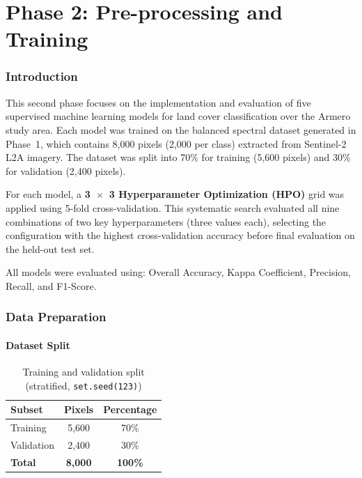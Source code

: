 \documentclass[12pt,a4paper]{article}
\begin{document}
\newpage

\part{Phase 2: Pre-processing and Training}

\section{Introduction}

This second phase focuses on the implementation and evaluation of five supervised machine learning models for land cover classification over the Armero study area. Each model was trained on the balanced spectral dataset generated in Phase~1, which contains 8,000 pixels (2,000 per class) extracted from Sentinel-2 L2A imagery. The dataset was split into 70\% for training (5,600 pixels) and 30\% for validation (2,400 pixels).

For each model, a \textbf{3~$\times$~3 Hyperparameter Optimization (HPO)} grid was applied using 5-fold cross-validation. This systematic search evaluated all nine combinations of two key hyperparameters (three values each), selecting the configuration with the highest cross-validation accuracy before final evaluation on the held-out test set.

All models were evaluated using: Overall Accuracy, Kappa Coefficient, Precision, Recall, and F1-Score.

\section{Data Preparation}

\subsection{Dataset Split}

\begin{table}[H]
\centering
\begin{tabular}{|m{5cm}|c|c|}
\hline
\textbf{Subset} & \textbf{Pixels} & \textbf{Percentage} \\
\hline
Training   & 5,600 & 70\% \\
\hline
Validation & 2,400 & 30\% \\
\hline
\textbf{Total} & \textbf{8,000} & \textbf{100\%} \\
\hline
\end{tabular}
\caption{Training and validation split (stratified, \texttt{set.seed(123)})}
\end{table}
\end{document}
